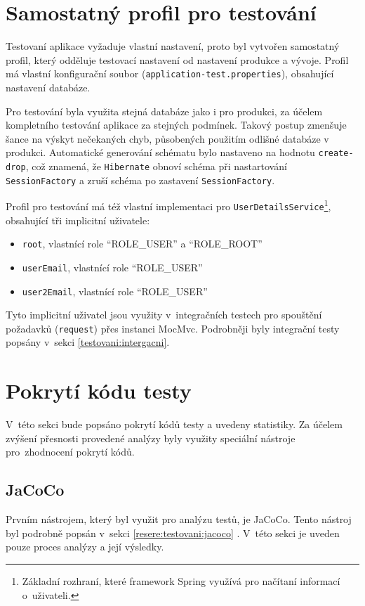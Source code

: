 \section{Samostatný profil pro testování}

    Testovaní aplikace vyžaduje vlastní nastavení, proto byl vytvořen samostatný profil, který odděluje testovací nastavení od nastavení produkce a vývoje. Profil má vlastní konfigurační soubor (\verb|application-test.properties|), obsahující nastavení databáze.
    
    Pro testování byla využita stejná databáze jako i pro produkci, za účelem kompletního testování aplikace za stejných podmínek. Takový postup zmenšuje šance na výskyt nečekaných chyb, působených použitím odlišné databáze v produkci. Automatické generování schématu bylo nastaveno na hodnotu \verb|create-drop|, což znamená, že \verb|Hibernate| obnoví schéma při nastartování \verb|SessionFactory| a zruší schéma po zastavení \verb|SessionFactory|.
    
    Profil pro testování má též vlastní implementaci pro \verb|UserDetailsService|\footnote{Základní rozhraní, které framework Spring využívá pro načítaní informací o~uživateli.}, obsahující tři implicitní uživatele:
    \begin{itemize}
            \item \verb|root|, vlastnící role \enquote{ROLE\_USER} a \enquote{ROLE\_ROOT} 
            \item \verb|userEmail|, vlastnící role \enquote{ROLE\_USER}
            \item \verb|user2Email|, vlastnící role \enquote{ROLE\_USER}
    \end{itemize}
    Tyto implicitní uživatel jsou využity v~integračních testech pro spouštění požadavků (\verb|request|) přes instanci MocMvc. Podrobněji byly integrační testy popsány v~sekci \ref{testovani:intergacni}.
    
\section{Pokrytí kódu testy}\label{testovani:pokryti}
    V~této sekci bude popsáno pokrytí kódů testy a uvedeny statistiky. Za účelem zvýšení přesnosti provedené analýzy byly využity speciální nástroje pro~zhodnocení pokrytí kódů.
    
    \subsection{JaCoCo}
    Prvním nástrojem, který byl využit pro analýzu testů, je JaCoCo. Tento nástroj byl podrobně popsán v~sekci \ref{resere:testovani:jacoco} . V~této sekci je uveden pouze proces analýzy a její výsledky.
    
